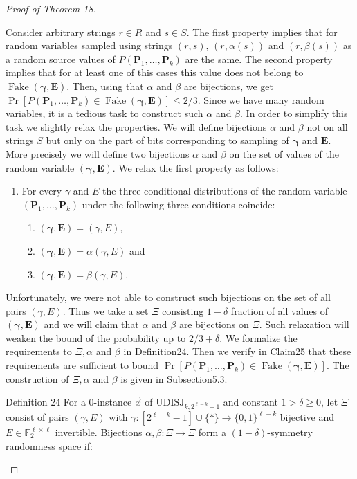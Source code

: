 \begin{proof}[Proof of Theorem 18]
\begin{enumerate}
\end{enumerate}
Consider arbitrary strings $r\in R$ and $s\in S$. The first property implies that for random variables sampled using strings $(r,s)$, $(r,\alpha(s))$ and $(r,\beta(s))$ as a random source values of $P(\mathbf P_1,\ldots,\mathbf P_k)$ are the same. The second property implies that for at least one of this cases this value does not belong to $\operatorname{Fake}(\boldsymbol\gamma,\mathbf E)$. Then, using that $\alpha$ and $\beta$ are bijections, we get $\Pr[P(\mathbf P_1,\ldots,\mathbf P_k)\in\operatorname{Fake}(\boldsymbol\gamma,\mathbf E)]\le2/3$.
Since we have many random variables, it is a tedious task to construct such $\alpha$ and $\beta$. In order to simplify this task we slightly relax the properties. We will define bijections $\alpha$ and $\beta$ not on all strings $S$ but only on the part of bits corresponding to sampling of $\boldsymbol\gamma$ and $\mathbf E$. More precisely we will define two bijections $\alpha$ and $\beta$ on the set of values of the random variable $(\boldsymbol\gamma,\mathbf E)$. We relax the first property as follows:
\begin{enumerate}
\item[1'.] For every $\gamma$ and $E$ the three conditional distributions of the random variable $(\mathbf P_1,\ldots,\mathbf P_k)$ under the following three conditions coincide:
\begin{enumerate}\item $(\boldsymbol\gamma,\mathbf E)=(\gamma,E)$,\item $(\boldsymbol\gamma,\mathbf E)=\alpha(\gamma,E)$ and\item $(\boldsymbol\gamma,\mathbf E)=\beta(\gamma,E)$.\end{enumerate}
\end{enumerate}
Unfortunately, we were not able to construct such bijections on the set of all pairs $(\gamma,E)$. Thus we take a set $\Xi$ consisting $1-\delta$ fraction of all values of $(\boldsymbol\gamma,\mathbf E)$ and we will claim that $\alpha$ and $\beta$ are bijections on $\Xi$. Such relaxation will weaken the bound of the probability up to $2/3+\delta$. We formalize the requirements to $\Xi,\alpha$ and $\beta$ in Definition24. Then we verify in Claim25 that these requirements are sufficient to bound $\Pr[P(\mathbf P_1,\ldots,\mathbf P_k)\in\operatorname{Fake}(\boldsymbol\gamma,\mathbf E)]$. The construction of $\Xi,\alpha$ and $\beta$ is given in Subsection5.3.
\begin{authorclaim}{Definition 24}
For a 0-instance $\vec x$ of $\mathrm{UDISJ}_{k,2^{\ell-k}-1}$ and constant $1>\delta\ge0$, let $\Xi$ consist of pairs $(\gamma,E)$ with $\gamma:[2^{\ell-k}-1]\cup\{*\}\to\{0,1\}^{\ell-k}$ bijective and $E\in\mathbb F_2^{\ell\times\ell}$ invertible. Bijections $\alpha,\beta:\Xi\to\Xi$ form a $(1-\delta)$-symmetry randomness space if:

\end{authorclaim}
\end{proof}
